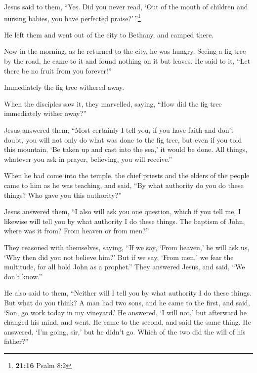 Jesus said to them, ``Yes. Did you never read, `Out of the mouth of
children and nursing babies, you have perfected praise?'\,''\footnote{\textbf{21:16}
  Psalm 8:2}

 He left them and went out of the city to Bethany, and
camped there.

 Now in the morning, as he returned to the city, he was
hungry.  Seeing a fig tree by the road, he came to it and
found nothing on it but leaves. He said to it, ``Let there be no fruit
from you forever!''

Immediately the fig tree withered away.

 When the disciples saw it, they marvelled, saying, ``How
did the fig tree immediately wither away?''

 Jesus answered them, ``Most certainly I tell you, if you
have faith and don't doubt, you will not only do what was done to the
fig tree, but even if you told this mountain, `Be taken up and cast into
the sea,' it would be done.  All things, whatever you ask
in prayer, believing, you will receive.''

 When he had come into the temple, the chief priests and
the elders of the people came to him as he was teaching, and said, ``By
what authority do you do these things? Who gave you this authority?''

 Jesus answered them, ``I also will ask you one question,
which if you tell me, I likewise will tell you by what authority I do
these things.  The baptism of John, where was it from?
From heaven or from men?''

They reasoned with themselves, saying, ``If we say, `From heaven,' he
will ask us, `Why then did you not believe him?'  But if
we say, `From men,' we fear the multitude, for all hold John as a
prophet.''  They answered Jesus, and said, ``We don't
know.''

He also said to them, ``Neither will I tell you by what authority I do
these things.  But what do you think? A man had two sons,
and he came to the first, and said, `Son, go work today in my vineyard.'
 He answered, `I will not,' but afterward he changed his
mind, and went.  He came to the second, and said the same
thing. He answered, `I'm going, sir,' but he didn't go. 
Which of the two did the will of his father?''

